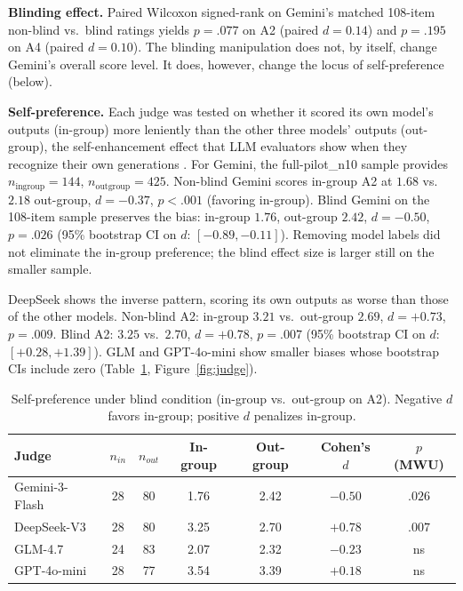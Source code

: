 \documentclass[11pt]{article}
\begin{document}
\textbf{Blinding effect.} Paired Wilcoxon signed-rank on Gemini's matched 108-item non-blind vs.\ blind ratings yields $p=.077$ on A2 (paired $d=0.14$) and $p=.195$ on A4 (paired $d=0.10$). The blinding manipulation does not, by itself, change Gemini's overall score level. It does, however, change the locus of self-preference (below).

\textbf{Self-preference.} Each judge was tested on whether it scored its own model's outputs (in-group) more leniently than the other three models' outputs (out-group), the self-enhancement effect that LLM evaluators show when they recognize their own generations \cite{panickssery2024}. For Gemini, the full-pilot\_n10 sample provides $n_{\text{ingroup}}=144$, $n_{\text{outgroup}}=425$. Non-blind Gemini scores in-group A2 at $1.68$ vs.\ $2.18$ out-group, $d=-0.37$, $p<.001$ (favoring in-group). Blind Gemini on the 108-item sample preserves the bias: in-group $1.76$, out-group $2.42$, $d=-0.50$, $p=.026$ (95\% bootstrap CI on $d$: $[-0.89,-0.11]$). Removing model labels did not eliminate the in-group preference; the blind effect size is larger still on the smaller sample.

DeepSeek shows the inverse pattern, scoring its own outputs as worse than those of the other models. Non-blind A2: in-group $3.21$ vs.\ out-group $2.69$, $d=+0.73$, $p=.009$. Blind A2: $3.25$ vs.\ $2.70$, $d=+0.78$, $p=.007$ (95\% bootstrap CI on $d$: $[+0.28,+1.39]$). GLM and GPT-4o-mini show smaller biases whose bootstrap CIs include zero (Table~\ref{tab:selfpref}, Figure~\ref{fig:judge}).

\begin{table}[h]
\centering
\caption{Self-preference under blind condition (in-group vs.\ out-group on A2). Negative $d$ favors in-group; positive $d$ penalizes in-group.}
\label{tab:selfpref}
\small
\begin{tabular}{l c c c c c c}
\toprule
\textbf{Judge} & \textbf{$n_{in}$} & \textbf{$n_{out}$} & \textbf{In-group} & \textbf{Out-group} & \textbf{Cohen's $d$} & \textbf{$p$ (MWU)} \\
\midrule
Gemini-3-Flash & 28 & 80 & 1.76 & 2.42 & $-0.50$ & $.026$ \\
DeepSeek-V3    & 28 & 80 & 3.25 & 2.70 & $+0.78$ & $.007$ \\
GLM-4.7        & 24 & 83 & 2.07 & 2.32 & $-0.23$ & ns \\
GPT-4o-mini    & 28 & 77 & 3.54 & 3.39 & $+0.18$ & ns \\
\bottomrule
\end{tabular}
\end{table}
\end{document}
